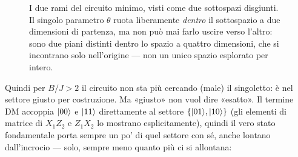 \documentclass[11pt,a4paper]{article}
\begin{document}
\begin{figure}[htbp]
\centering
{}
\caption{I due rami del circuito minimo, visti come due sottospazi disgiunti.
Il singolo parametro $\theta$ ruota liberamente \emph{dentro} il sottospazio a
due dimensioni di partenza, ma non può mai farlo uscire verso l'altro: sono
due piani distinti dentro lo spazio a quattro dimensioni, che si incontrano
solo nell'origine --- non un unico spazio esplorato per intero.}
\label{fig:due-rami}
\end{figure}

\FloatBarrier

Quindi per $B/J>2$ il circuito non sta più cercando (male) il singoletto: è
nel settore giusto per costruzione. Ma «giusto» non vuol dire «esatto». Il
termine DM accoppia $\lvert 00\rangle$ e $\lvert 11\rangle$ direttamente al settore
$\{\lvert 01\rangle,\lvert 10\rangle\}$ (gli elementi di matrice di $X_1Z_2$ e $Z_1X_2$ lo
mostrano esplicitamente), quindi il vero stato fondamentale porta sempre un po'
di quel settore con sé, anche lontano dall'incrocio --- solo, sempre meno
quanto più ci si allontana:
\end{document}
